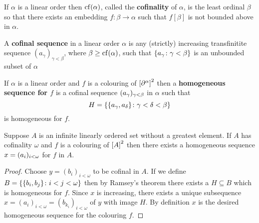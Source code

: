     \begin{dfn}[Cofinality]
        If $\alpha$ is a linear order then $\cf(\alpha)$, called the \textbf{cofinality} of $\alpha$, is the least ordinal $\beta$ so that there exists an embedding $f\colon\beta\to\alpha$ such that $f[\beta]$ is not bounded above in $\alpha$.
    \end{dfn}

    \begin{dfn}
        A \textbf{cofinal sequence} in a linear order $\alpha$ is any (strictly) increasing transfinitite sequence $(a_\gamma)_{\gamma<\beta}$, where $\beta\geq\cf(\alpha)$, such that $\setbuild{a_\gamma}{\gamma<\beta}$ is an unbounded subset of $\alpha$
    \end{dfn}

    \begin{dfn}
        If $\alpha$ is a linear order and $f$ is a colouring of $\subsets{2}{\domain\alpha}$ then a \textbf{homogeneous sequence for $f$} is a cofinal sequence $\family{a_\gamma}{\gamma<\beta}$ in $\alpha$ such that
        \begin{equation}
            H=\setbuild{\set{a_\gamma,a_\delta}}{\gamma<\delta<\beta}
        \end{equation}
        is homogeneous for $f$.
    \end{dfn}

    \begin{cor}\label{cor:Cofinal}
        Suppose $A$ is an infinite linearly ordered set without a greatest element. If $A$ has cofinality $\omega$ and $f$ is a colouring of $\subsets{2}{A}$ then there exists a homogeneous sequence $x=\family{a_i}{i<\omega}$ for $f$ in $A$.
    \end{cor}

    \begin{proof}
        Choose $y=(b_i)_{i<\omega}$ to be cofinal in $A$.  If we define $B=\setbuild{\set{b_i,b_j}}{i<j<\omega}$ then by Ramsey's theorem there exists a $H\subseteq B$ which is homogeneous for $f$.  Since $x$ is increasing, there exists a unique subsequence $x=(a_i)_{i<\omega}=(b_{k_i})_{i<\omega}$ of $y$ with image $H$.  By definition $x$ is the desired homogeneous sequence for the colouring $f$.
    \end{proof}

